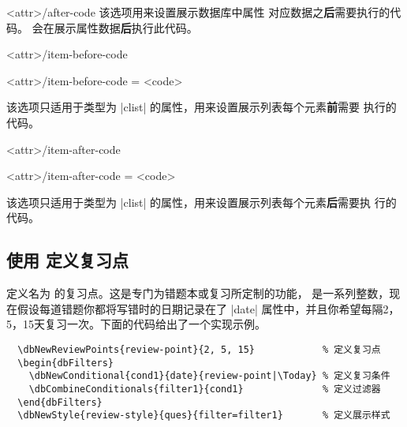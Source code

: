 \documentclass[full]{l3doc}
\def\zhbefore{\textbf{前}}
\def\zhafter{\textbf{后}}
\begin{document}
\begin{documentation}
\begin{option}[added=2022-01-05, rEXP]{<attr>/after-code}
  该选项用来设置展示数据库中属性  对应数据之\zhafter 需要执行的代码。
   会在展示属性数据\zhafter 执行此代码。
\end{option}

\begin{option}[added=2022-01-05, rEXP]{<attr>/item-before-code}
  \begin{syntax}
    <attr>/item-before-code = <code>
  \end{syntax}

  该选项只适用于类型为 |clist| 的属性，用来设置展示列表每个元素\zhbefore 需要
  执行的代码。
\end{option}

\begin{option}[added=2022-01-05, rEXP]{<attr>/item-after-code}
  \begin{syntax}
    <attr>/item-after-code = <code>
  \end{syntax}

  该选项只适用于类型为 |clist| 的属性，用来设置展示列表每个元素\zhafter 需要执
  行的代码。
\end{option}

\subsection{使用  定义复习点}

\begin{function}[added=2022-01-05]{\dbNewReviewPoints}
  \begin{syntax}
      
  \end{syntax}

  定义名为  的复习点。这是专门为错题本或复习所定制的功能，
  是一系列整数，现在假设每道错题你都将写错时的日期记录在了 |date|
  属性中，并且你希望每隔2，5，15天复习一次。下面的代码给出了一个实现示例。
\end{function}

\begin{verbatim}
  \dbNewReviewPoints{review-point}{2, 5, 15}            % 定义复习点
  \begin{dbFilters}
    \dbNewConditional{cond1}{date}{review-point|\Today} % 定义复习条件
    \dbCombineConditionals{filter1}{cond1}              % 定义过滤器
  \end{dbFilters}
  \dbNewStyle{review-style}{ques}{filter=filter1}       % 定义展示样式
\end{verbatim}


\end{documentation}
\end{document}
